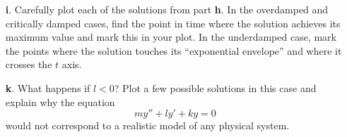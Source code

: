 \documentclass[10pt,psamsfonts,reqno,oneside,letterpaper]{amsart}
\begin{document}
\begin{enumerate}[I]
\begin{enumerate}
		\item[\textbf{i}.] Carefully plot each of the solutions from part \textbf{h}.  In the overdamped and critically damped cases, find the point in time where the solution achieves its maximum value and mark this in your plot.   In the underdamped case, mark the points where the solution touches its ``exponential envelope'' and where it crosses the $t$ axis.   
		\item[\textbf{k}.] What happens if $l<0$?  Plot a few possible solutions in this case and explain why the equation
		\[ my'' + ly' + ky = 0 \]
		would not correspond to a realistic model of any physical system.
	\end{enumerate}
	
	
	
	\end{enumerate}	
\end{document}
